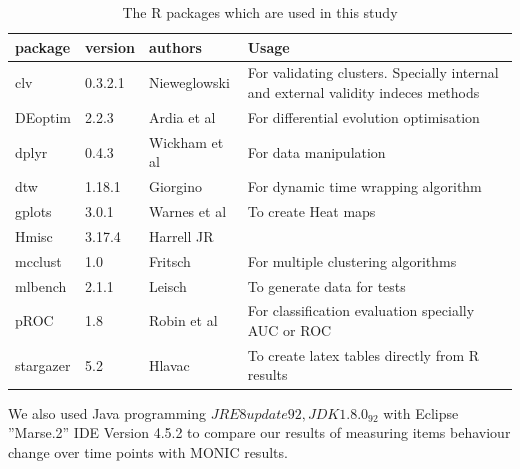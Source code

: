 \begin{table}[!h]
	\small
	\centering
	\begin{tabular}{lllp{6cm}}
		\toprule
		package & version & authors        & Usage                    \\ \midrule
		clv  & 0.3.2.1 & Nieweglowski \cite{Nieweglowski2013} & For validating clusters. Specially internal and external validity indeces methods \\ 
		DEoptim & 2.2.3 & Ardia et al \cite{Ardia2015}   & For differential evolution optimisation           \\
		dplyr  & 0.4.3 & Wickham et al \cite{Wickham2015}  & For data manipulation     \\ 
		dtw  & 1.18.1 & Giorgino \cite{Giorgino2009}   & For dynamic time wrapping algorithm \\
		gplots & 3.0.1 & Warnes et al \cite{Warnes2016}  & To create Heat maps        \\
		Hmisc  & 3.17.4 & Harrell JR \cite{Jr2016}    &                     \\
		mcclust & 1.0  & Fritsch \cite{Fritsch2012}   & For multiple clustering algorithms   \\
		mlbench & 2.1.1 & Leisch \cite{mlbench210}    & To generate data for tests   \\
		pROC  & 1.8  & Robin et al \cite{Robin2014}   & For classification evaluation specially AUC or ROC\\
		stargazer & 5.2  & Hlavac \cite{Hlavac2015}    & To create latex tables directly from R results         \\
		\bottomrule
	\end{tabular}
	\caption{The R packages which are used in this study}
	\label{tab:RenvirontmentPackages}
\end{table}

We also used Java programming \(JRE 8 update 92, JDK 1.8.0_92\) with Eclipse ''Marse.2'' IDE Version 4.5.2 to compare our results of measuring items behaviour change over time points with MONIC \cite{Spiliopoulou2006} results.


 